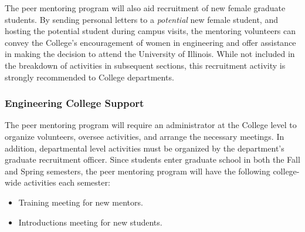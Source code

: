The peer mentoring program will also aid 
recruitment of new female graduate students. 
By sending personal letters to a {\sl potential} new female student,
and hosting the potential student during campus visits,
the mentoring volunteers can convey the College's encouragement of
women in engineering
and offer assistance in making the decision to attend the University
of Illinois.
While not included in the breakdown of activities in subsequent
sections,  this recruitment
activity is strongly recommended to College departments.
 
\subsubsection{Engineering College Support}
\label{college}

The peer mentoring program will require an administrator 
at the College level to organize volunteers,
oversee activities, and arrange the necessary meetings.
In addition, departmental level activities must be organized
by the department's graduate recruitment officer.
Since students enter graduate school in both the Fall and Spring semesters,
the peer mentoring program will have the following 
college-wide activities each semester:
\begin{itemize}
\item {Training meeting for new mentors.}
\item {Introductions meeting for new students.}
\end{itemize}

